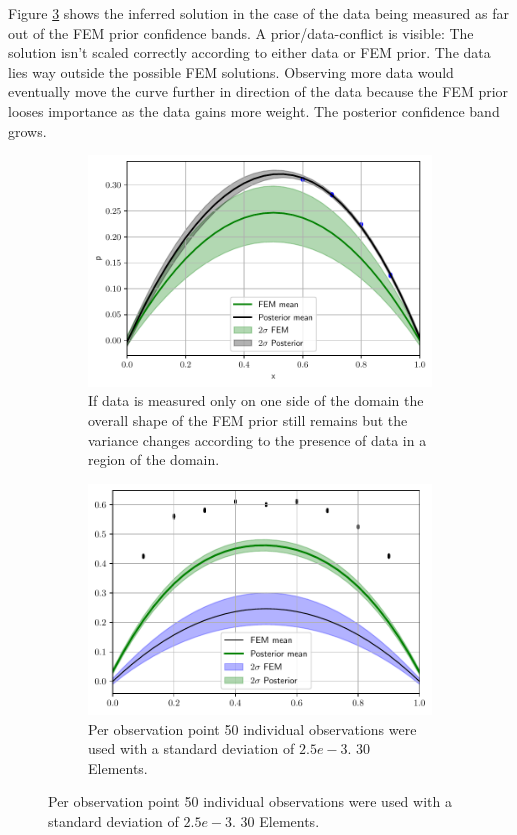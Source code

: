 \documentclass[%
  a4paper,oneside,%
  11pt,%
  smallchapters,
  style=printdev,
  extramargin,
  green,%
  rgb, <cmyk>
  ]{tubsbook}
\begin{document}
Figure \ref{fig:DataPriorConflict} shows the inferred solution in the case of the data being measured as far out of the FEM prior confidence bands. A prior/data-conflict is visible: The solution isn't scaled correctly according to either data or FEM prior. The data lies way outside the possible FEM solutions. Observing more data would eventually move the curve further in direction of the data because the FEM prior looses importance as the data gains more weight. The posterior confidence band grows.

\begin{figure}[!ht]

	\begin{subfigure}[t]{.5\textwidth}
	\centering
	\includegraphics[width=1\linewidth]{pics/1DPost_RightSide.pdf}
	\caption{If data is measured only on one side of the domain the overall shape of the FEM prior still remains but the variance changes according to the presence of data in a region of the domain.}
		\label{fig:DOneSided}
	\end{subfigure}%
	\begin{subfigure}[t]{.5\textwidth}
	\centering
	\includegraphics[width=1\linewidth]{pics/DataPriorMismatch.pdf}
\centering
\caption{Per observation point 50 individual observations were used with a standard deviation of $2.5e-3$. 30 Elements.}
\label{fig:DataPriorConflict}
	\end{subfigure}


\end{figure}
\end{document}
